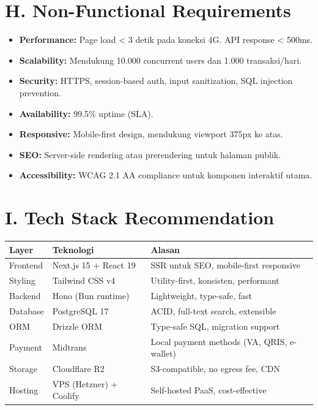 \documentclass[11pt,a4paper]{article}
\begin{document}
\section{H. Non-Functional Requirements}
\begin{itemize}[noitemsep,leftmargin=1.5cm]
\item \textbf{Performance:} Page load < 3 detik pada koneksi 4G. API response < 500ms.
\item \textbf{Scalability:} Mendukung 10.000 concurrent users dan 1.000 transaksi/hari.
\item \textbf{Security:} HTTPS, session-based auth, input sanitization, SQL injection prevention.
\item \textbf{Availability:} 99.5\% uptime (SLA).
\item \textbf{Responsive:} Mobile-first design, mendukung viewport 375px ke atas.
\item \textbf{SEO:} Server-side rendering atau prerendering untuk halaman publik.
\item \textbf{Accessibility:} WCAG 2.1 AA compliance untuk komponen interaktif utama.
\end{itemize}

\section{I. Tech Stack Recommendation}
\noindent\small
\begin{tabularx}{\textwidth}{|p{2.5cm}|p{3.5cm}|X|}
\hline
\centering\textbf{Layer}\arraybackslash & \centering\textbf{Teknologi}\arraybackslash & \centering\textbf{Alasan}\arraybackslash \\\hline
Frontend & Next.js 15 + React 19 & SSR untuk SEO, mobile-first responsive \\\hline
Styling & Tailwind CSS v4 & Utility-first, konsisten, performant \\\hline
Backend & Hono (Bun runtime) & Lightweight, type-safe, fast \\\hline
Database & PostgreSQL 17 & ACID, full-text search, extensible \\\hline
ORM & Drizzle ORM & Type-safe SQL, migration support \\\hline
Payment & Midtrans & Local payment methods (VA, QRIS, e-wallet) \\\hline
Storage & Cloudflare R2 & S3-compatible, no egress fee, CDN \\\hline
Hosting & VPS (Hetzner) + Coolify & Self-hosted PaaS, cost-effective \\\hline
\end{tabularx}\normalsize
\end{document}
